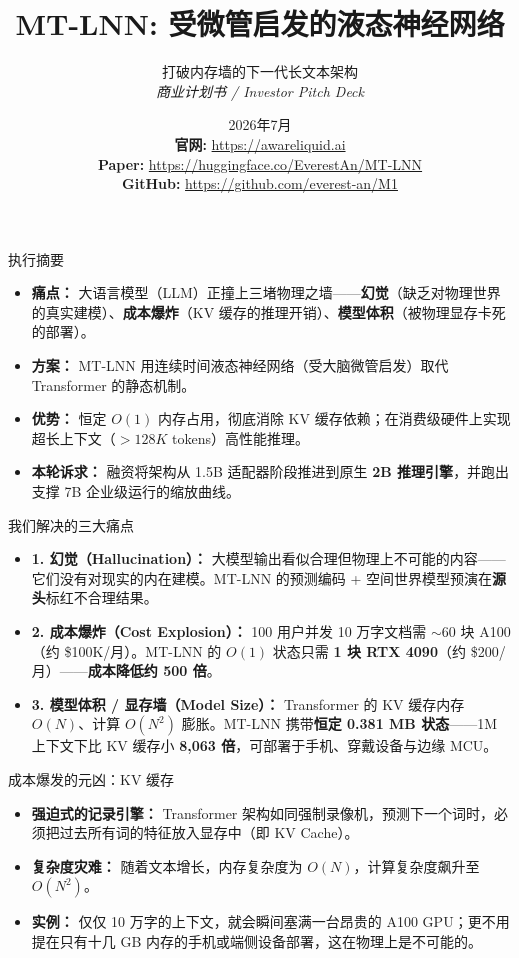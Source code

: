 \documentclass[aspectratio=169, 10pt]{beamer}
\title{MT-LNN: 受微管启发的液态神经网络}
\subtitle{打破内存墙的下一代长文本架构 \\ \textit{商业计划书 / Investor Pitch Deck}}
\author{\Huge \aeonik{Awareness}}
\date{2026年7月 \\[1em]
\footnotesize
\textbf{官网:} \url{https://awareliquid.ai} \\
\textbf{Paper:} \url{https://huggingface.co/EverestAn/MT-LNN} \\
\textbf{GitHub:} \url{https://github.com/everest-an/M1}
}
\begin{document}
\frame{\titlepage}

\begin{frame}{执行摘要}
\begin{itemize}
    \item \textbf{痛点：} 大语言模型（LLM）正撞上三堵物理之墙——\textbf{幻觉}（缺乏对物理世界的真实建模）、\textbf{成本爆炸}（KV 缓存的推理开销）、\textbf{模型体积}（被物理显存卡死的部署）。
    \item \textbf{方案：} MT-LNN 用连续时间液态神经网络（受大脑微管启发）取代 Transformer 的静态机制。
    \item \textbf{优势：} 恒定 $O(1)$ 内存占用，彻底消除 KV 缓存依赖；在消费级硬件上实现超长上下文（$>128K$ tokens）高性能推理。
    \item \textbf{本轮诉求：} 融资将架构从 1.5B 适配器阶段推进到原生 \textbf{2B 推理引擎}，并跑出支撑 7B 企业级运行的缩放曲线。
\end{itemize}
\end{frame}

\begin{frame}{我们解决的三大痛点}
\begin{itemize}
    \item \textbf{1. 幻觉（Hallucination）：} 大模型输出看似合理但物理上不可能的内容——它们没有对现实的内在建模。MT-LNN 的预测编码 + 空间世界模型预演在\textbf{源头}标红不合理结果。
    \item \textbf{2. 成本爆炸（Cost Explosion）：} 100 用户并发 10 万字文档需 $\sim$60 块 A100（约 \$100K/月）。MT-LNN 的 $O(1)$ 状态只需 \textbf{1 块 RTX 4090}（约 \$200/月）——\textbf{成本降低约 500 倍}。
    \item \textbf{3. 模型体积 / 显存墙（Model Size）：} Transformer 的 KV 缓存内存 $O(N)$、计算 $O(N^2)$ 膨胀。MT-LNN 携带\textbf{恒定 0.381 MB 状态}——1M 上下文下比 KV 缓存小 \textbf{8{,}063 倍}，可部署于手机、穿戴设备与边缘 MCU。
\end{itemize}
\end{frame}

\begin{frame}{成本爆发的元凶：KV 缓存}
\begin{itemize}
    \item \textbf{强迫式的记录引擎：} Transformer 架构如同强制录像机，预测下一个词时，必须把过去所有词的特征放入显存中（即 KV Cache）。
    \item \textbf{复杂度灾难：} 随着文本增长，内存复杂度为 $O(N)$，计算复杂度飙升至 $O(N^2)$。
    \item \textbf{实例：} 仅仅 10 万字的上下文，就会瞬间塞满一台昂贵的 A100 GPU；更不用提在只有十几 GB 内存的手机或端侧设备部署，这在物理上是不可能的。
\end{itemize}
\end{frame}
\end{document}
